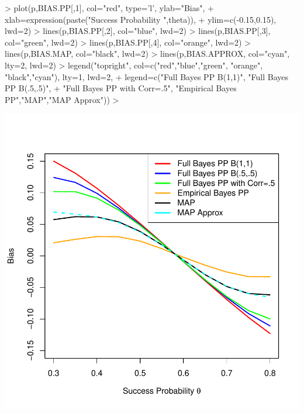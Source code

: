 \documentclass{article}
\begin{document}
\begin{Schunk}
\begin{Sinput}
> plot(p,BIAS.PP[,1],  col="red", type='l', ylab="Bias",
+      xlab=expression(paste("Success Probability ",theta)),
+      ylim=c(-0.15,0.15), lwd=2)
> lines(p,BIAS.PP[,2],  col="blue", lwd=2)
> lines(p,BIAS.PP[,3],  col="green", lwd=2)
> lines(p,BIAS.PP[,4],  col="orange", lwd=2)
> lines(p,BIAS.MAP,  col="black", lwd=2)
> lines(p,BIAS.APPROX,  col="cyan", lty=2, lwd=2)
> legend("topright", col=c("red","blue","green", "orange", "black","cyan"), lty=1, lwd=2,
+        legend=c("Full Bayes PP B(1,1)", "Full Bayes PP B(.5,.5)",
+                 "Full Bayes PP with Corr=.5", "Empirical Bayes PP","MAP","MAP Approx"))
> 
\end{Sinput}
\end{Schunk}
\includegraphics{Binomial-biasplot}
\end{document}
